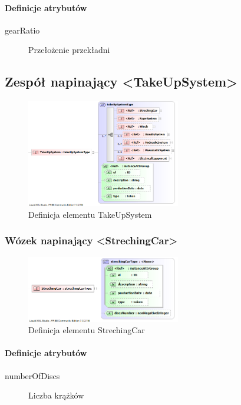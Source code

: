 \documentclass[12pt,a4paper]{article}
\begin{document}
\paragraph{Definicje atrybutów}
\begin{description}
\item[gearRatio] Przełożenie przekładni
\end{description}


\subsection{Zespół napinający <TakeUpSystem>}

\begin{figure}[h]
  \centering
  \includegraphics[width=0.6\textwidth]{png/liquid/TakeUpSystem}
  \caption{Definicja elementu TakeUpSystem}
  \label{fig:takeUpSystem-xsd}
\end{figure}


\subsubsection{Wózek napinający <StrechingCar>}

\begin{figure}[h]
  \centering
  \includegraphics[width=0.6\textwidth]{png/liquid/StrechingCar}
  \caption{Definicja elementu StrechingCar}
  \label{fig:strechingCar-xsd}
\end{figure}

\paragraph{Definicje atrybutów}
\begin{description}
\item[numberOfDiscs] Liczba krążków
\end{description}
\end{document}
